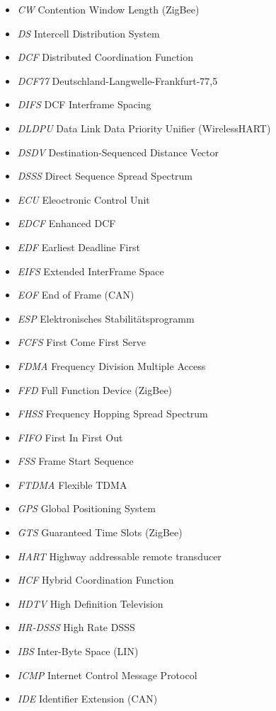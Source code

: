 \documentclass{article}
\begin{document}
\begin{itemize}
	\item \emph{CW} Contention Window Length (ZigBee)
	\item \emph{DS} Intercell Distribution System
	\item \emph{DCF} Distributed Coordination Function
	\item \emph{DCF77} Deutschland-Langwelle-Frankfurt-77,5
	\item \emph{DIFS} DCF Interframe Spacing
	\item \emph{DLDPU} Data Link Data Priority Unifier (WirelessHART)
	\item \emph{DSDV} Destination-Sequenced Distance Vector
	\item \emph{DSSS} Direct Sequence Spread Spectrum
	\item \emph{ECU} Eleoctronic Control Unit
	\item \emph{EDCF} Enhanced DCF
	\item \emph{EDF} Earliest Deadline First
	\item \emph{EIFS} Extended InterFrame Space
	\item \emph{EOF} End of Frame (CAN)
	\item \emph{ESP} Elektronisches Stabilitätsprogramm
	\item \emph{FCFS} First Come First Serve
	\item \emph{FDMA} Frequency Division Multiple Access
	\item \emph{FFD} Full Function Device (ZigBee)
	\item \emph{FHSS} Frequency Hopping Spread Spectrum
	\item \emph{FIFO} First In First Out
	\item \emph{FSS} Frame Start Sequence
	\item \emph{FTDMA} Flexible TDMA
	\item \emph{GPS} Global Positioning System
	\item \emph{GTS} Guaranteed Time Slots (ZigBee)
	\item \emph{HART} Highway addressable remote transducer
	\item \emph{HCF} Hybrid Coordination Function
	\item \emph{HDTV} High Definition Television
	\item \emph{HR-DSSS} High Rate DSSS
	\item \emph{IBS} Inter-Byte Space (LIN)
	\item \emph{ICMP} Internet Control Message Protocol
	\item \emph{IDE} Identifier Extension (CAN)

\end{itemize}
\end{document}
